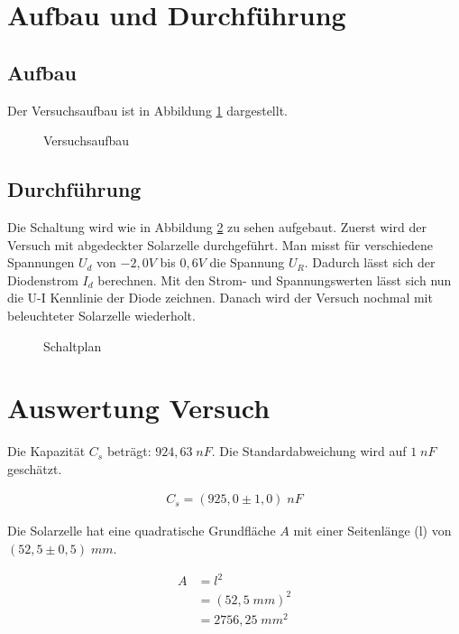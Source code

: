 \documentclass[a4paper]{scrartcl}
\numberwithin{equation}{subsection}
\begin{document}
\newpage
\section{Aufbau und Durchführung}
\subsection{Aufbau}
Der Versuchsaufbau ist in Abbildung \ref{fig:Aufbau} dargestellt.

\begin{figure}[H]
\centering
\caption{Versuchsaufbau}
\centering
\label{fig:Aufbau}
\end{figure}

\subsection{Durchführung}
Die Schaltung wird wie in Abbildung \ref{fig:Schaltplan} zu sehen
aufgebaut. Zuerst wird der Versuch mit abgedeckter Solarzelle durchgeführt. Man misst für verschiedene Spannungen $U_d$ von $-2,0V$
bis $0,6V$ die Spannung $U_R$. Dadurch lässt sich der Diodenstrom $I_d$ berechnen.
Mit den Strom- und Spannungswerten lässt sich nun die U-I Kennlinie der
Diode zeichnen. Danach wird der Versuch nochmal mit beleuchteter Solarzelle
wiederholt.

\begin{figure}[H]
\centering
\caption{Schaltplan}
\centering
\label{fig:Schaltplan}
\end{figure}

\newpage
\section{Auswertung Versuch}
Die Kapazität $C_s$ beträgt: $924,63\;nF$. Die Standardabweichung wird
auf $1\;nF$ geschätzt.

\begin{align*}
C_s = (925,0\pm 1,0)\;nF	
\end{align*}

Die Solarzelle hat eine quadratische Grundfläche $A$ mit einer Seitenlänge (l)
von $(52,5\pm 0,5)\;mm$.

\begin{align*}
A &= l^2 \\
 &= (52,5\;mm)^2 \\
 &= 2756,25\;mm^2
\end{align*}
\end{document}
